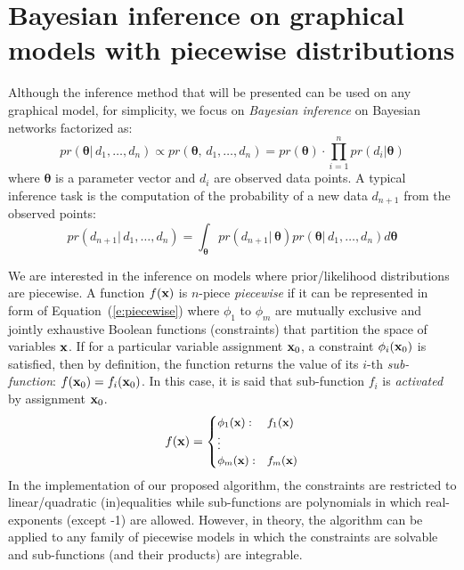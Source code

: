 
\section{Bayesian inference on graphical models with piecewise distributions}
\label{sec:inference_piecewise_models}
 Although the inference method that will be presented can be used on 
any graphical model, for simplicity, we focus on \emph{Bayesian inference} 
on Bayesian networks factorized as: 
\begin{equation}
\label{e:posterior}
pr(\boldsymbol\theta | \, d_1, \ldots, d_n) 
\propto
pr(\boldsymbol\theta, \, d_1, \ldots, d_n) 
= pr(\boldsymbol\theta) \cdot \prod_{i=1}^{n} pr(d_i | \boldsymbol\theta)
\end{equation} 
where $\boldsymbol\theta$ is a parameter vector and $d_i$ are observed data points. 
A typical inference task is the computation of the probability of a new data $d_{n+1}$ from the observed points:
\begin{equation}
\label{e:prob.outcome}
pr(d_{n+1} | \, d_1, \ldots, d_n) = 
\int_{\boldsymbol\theta} pr(d_{n+1} | \, \boldsymbol\theta) pr(\boldsymbol\theta | \, d_1, \ldots, d_n) d\boldsymbol\theta 
\end{equation}

We are interested in the inference on models where prior/likelihood distributions are piecewise.
A function $f(\textbf{x})$ is $n$-piece \emph{piecewise} if it can be represented in form of Equation~(\ref{e:piecewise}) where $\phi_1$ to $\phi_m$ are mutually exclusive and jointly exhaustive Boolean functions (constraints) 
that partition the space of variables $\textbf{x}$. If for a particular variable assignment $\textbf{x}_0$, a constraint $\phi_i(\textbf{x}_0)$ is satisfied, then by definition, the function returns the value of its $i$-th \emph{sub-function}: $f(\textbf{x}_0) = f_i(\textbf{x}_0)$.  
In this case, it is said that sub-function $f_i$ is \emph{activated} by assignment $\textbf{x}_0$.
\begin{equation}
\label{e:piecewise}
f(\bvec{x}) = 
{\footnotesize
\begin{cases}
\phi_1(\bvec{x}) : & f_1(\bvec{x})\\
\vdots\\
\phi_m(\bvec{x}) : & f_m(\bvec{x})
\end{cases}
}%
\end{equation}
In the implementation of our proposed algorithm, the constraints are restricted to linear/quadratic (in)equalities while sub-functions are polynomials in which real-exponents (except -1) are allowed.
However, in theory, the algorithm can be applied to any family of piecewise models in which the constraints are solvable and sub-functions (and their products) are integrable. 

